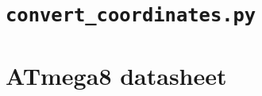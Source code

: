 \documentclass[brazil,pagestart=firstchapter]{abnt}
\begin{document}









\apendice

\chapter{\texttt{convert\_coordinates.py}}
\label{ape:convert_coordinates}



%
%
%
%
%
%
%
%
%
%
%
%
%
%
%
%
%
%


\anexo


\chapter{ATmega8 datasheet}
\label{anx:atmega8_datasheet}
\end{document}
